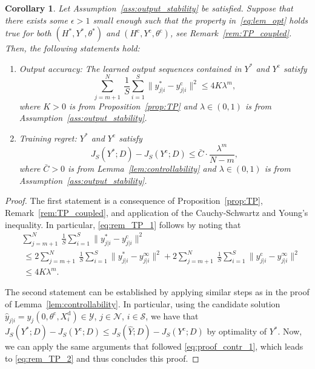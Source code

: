 \documentclass{article} %
\newtheorem{cor}{Corollary}
\begin{document}
\begin{cor}\label{cor:TP}
	Let Assumption~\ref{ass:output_stability} be satisfied.
	Suppose that there exists some $\epsilon>1$ small enough such that the property in~\eqref{eq:lem_opt} holds true for both $(H^*,Y^*,\theta^*)$ and $(H^\mathrm{c},Y^\mathrm{c},\theta^\mathrm{c})$, see Remark~\ref{rem:TP_coupled}. Then, the following statements hold:
	\begin{enumerate}
		\item Output accuracy: The learned output sequences contained in $Y^*$ and $Y^\mathrm{c}$ satisfy
		\begin{equation}\label{eq:rem_TP_1}
			\sum_{j=m+1}^{N} \ \frac{1}{S}\sum_{i=1}^{S}\|{y}_{j|i}^*-{y}_{j|i}^\mathrm{c}\|^2
			\leq 4K\lambda^m,
		\end{equation}
		where $K>0$ is from Proposition~\ref{prop:TP} and $\lambda\in(0,1)$ is from Assumption~\ref{ass:output_stability}.
		
		\item Training regret: $Y^*$ and $Y^\mathrm{c}$ satisfy
		\begin{equation}\label{eq:rem_TP_2}
			J_S(Y^*;D) - J_S(Y^\mathrm{c};D)\leq \bar{C} \cdot \frac{\lambda^m}{N-m},
		\end{equation}
		where $\bar{C}>0$ is from Lemma~\ref{lem:controllability} and $\lambda\in(0,1)$ is from Assumption~\ref{ass:output_stability}.
	\end{enumerate}
\end{cor}

\begin{proof}
	 The first statement is a consequence of Proposition~\ref{prop:TP}, Remark~\ref{rem:TP_coupled}, and application of the Cauchy-Schwartz and Young's inequality.
	 In particular, \eqref{eq:rem_TP_1} follows by noting that
	 \begin{align*}
	 	&\sum_{j=m+1}^{N} \ \frac{1}{S}\sum_{i=1}^{S}\|{y}_{j|i}^*-{y}_{j|i}^\mathrm{c}\|^2\\
	 	&\ \leq 2 \sum_{j=m+1}^{N} \ \frac{1}{S}\sum_{i=1}^{S}\|{y}_{j|i}^*-{y}_{j|i}^\infty\|^2 + 2\sum_{j=m+1}^{N}\ \frac{1}{S}\sum_{i=1}^{S}\|{y}_{j|i}^\mathrm{c}-{y}_{j|i}^\infty\|^2\\
	 	&\ \leq 4K\lambda^m.
	 \end{align*}
	 
	 The second statement can be established by applying similar steps as in the proof of Lemma~\ref{lem:controllability}. In particular, using the candidate solution $\hat{y}_{j|i}=y_j(0,\theta^\mathrm{c},X^\mathrm{d}_i)\in\mathcal{Y}$, $j\in\mathcal{N}$, $i\in\mathcal{S}$, we have that $J_S(Y^*;D) - J_S(Y^\mathrm{c};D) \leq J_S(\hat{Y};D) - J_S(Y^\mathrm{c};D)$ by optimality of $Y^*$.
	 Now, we can apply the same arguments that followed \eqref{eq:proof_contr_1}, which leads to \eqref{eq:rem_TP_2} and thus concludes this proof.
\end{proof}
\end{document}

